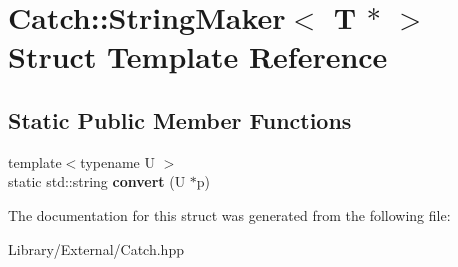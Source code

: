 \hypertarget{struct_catch_1_1_string_maker_3_01_t_01_5_01_4}{}\section{Catch\+:\+:String\+Maker$<$ T $\ast$ $>$ Struct Template Reference}
\label{struct_catch_1_1_string_maker_3_01_t_01_5_01_4}
\subsection*{Static Public Member Functions}
\begin{DoxyCompactItemize}
\item 
\hypertarget{struct_catch_1_1_string_maker_3_01_t_01_5_01_4_a2adbc75c99d71b8323f4052bcb0815c9}{}{\footnotesize template$<$typename U $>$ }\\static std\+::string {\bfseries convert} (U $\ast$p)\label{struct_catch_1_1_string_maker_3_01_t_01_5_01_4_a2adbc75c99d71b8323f4052bcb0815c9}

\end{DoxyCompactItemize}


The documentation for this struct was generated from the following file\+:\begin{DoxyCompactItemize}
\item 
Library/\+External/Catch.\+hpp\end{DoxyCompactItemize}
